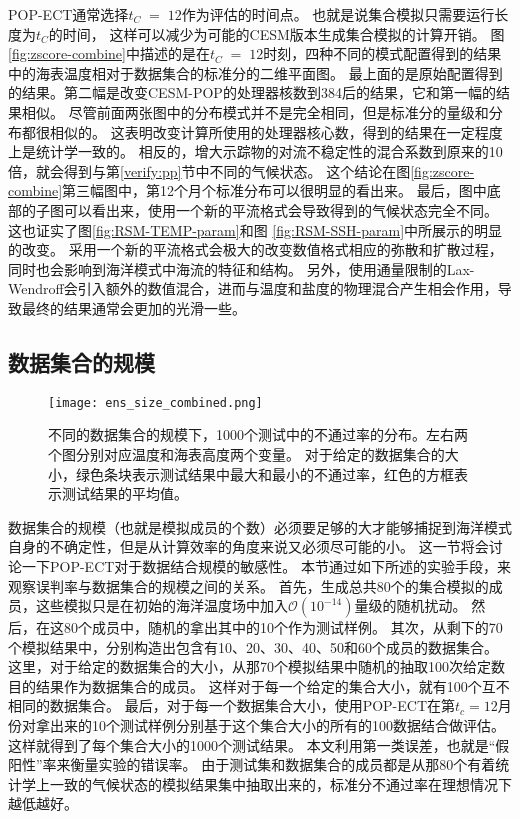 POP-ECT通常选择$t_C \;=\; 12$作为评估的时间点。
也就是说集合模拟只需要运行长度为$t_C$的时间， 这样可以减少为可能的CESM版本生成集合模拟的计算开销。
图 \ref{fig:zscore-combine}中描述的是在$t_C \;=\; 12$时刻，四种不同的模式配置得到的结果中的海表温度相对于数据集合的标准分的二维平面图。
最上面的是原始配置得到的结果。第二幅是改变CESM-POP的处理器核数到384后的结果，它和第一幅的结果相似。
尽管前面两张图中的分布模式并不是完全相同，但是标准分的量级和分布都很相似的。
这表明改变计算所使用的处理器核心数，得到的结果在一定程度上是统计学一致的。
相反的，增大示踪物的对流不稳定性的混合系数到原来的10倍，就会得到与第\ref{verify:pp}节中不同的气候状态。
这个结论在图\ref{fig:zscore-combine}第三幅图中，第12个月个标准分布可以很明显的看出来。 
最后，图中底部的子图可以看出来，使用一个新的平流格式会导致得到的气候状态完全不同。
这也证实了图\ref{fig:RSM-TEMP-param}和图 \ref{fig:RSM-SSH-param}中所展示的明显的改变。 
采用一个新的平流格式会极大的改变数值格式相应的弥散和扩散过程\cite{tseng2008}，同时也会影响到海洋模式中海流的特征和结构\cite{tseng2006}。
另外，使用通量限制的Lax-Wendroff会引入额外的数值混合，进而与温度和盐度的物理混合产生相会作用，导致最终的结果通常会更加的光滑一些。



\subsection{数据集合的规模} \label{verify:ens}

\begin{figure} 
\centering
\texttt{[image: ens\_size\_combined.png]}
\caption{ 不同的数据集合的规模下，1000个测试中的不通过率的分布。左右两个图分别对应温度和海表高度两个变量。
对于给定的数据集合的大小，绿色条块表示测试结果中最大和最小的不通过率，红色的方框表示测试结果的平均值。}
\label{fig:temp_ens_80}
\end {figure}
数据集合的规模（也就是模拟成员的个数）必须要足够的大才能够捕捉到海洋模式自身的不确定性，但是从计算效率的角度来说又必须尽可能的小。
这一节将会讨论一下POP-ECT对于数据结合规模的敏感性。
本节通过如下所述的实验手段，来观察误判率与数据集合的规模之间的关系。 
首先，生成总共80个的集合模拟的成员，这些模拟只是在初始的海洋温度场中加入$\mathcal{O}(10^{-14})$量级的随机扰动。 
然后，在这80个成员中，随机的拿出其中的10个作为测试样例。 
其次，从剩下的70个模拟结果中，分别构造出包含有10、20、30、40、50和60个成员的数据集合。 
这里，对于给定的数据集合的大小，从那70个模拟结果中随机的抽取100次给定数目的结果作为数据集合的成员。
这样对于每一个给定的集合大小，就有100个互不相同的数据集合。 
最后，对于每一个数据集合大小，使用POP-ECT在第$t_c = 12$月份对拿出来的10个测试样例分别基于这个集合大小的所有的100数据结合做评估。
这样就得到了每个集合大小的1000个测试结果。
本文利用第一类误差，也就是“假阳性”率来衡量实验的错误率。 
由于测试集和数据集合的成员都是从那80个有着统计学上一致的气候状态的模拟结果集中抽取出来的，标准分不通过率在理想情况下越低越好。 

